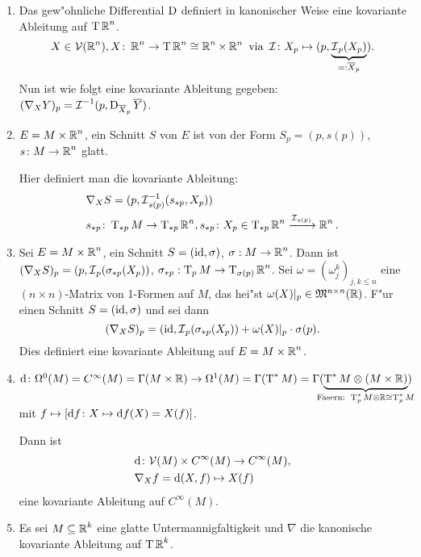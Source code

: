 \begin{bsp}
  \begin{enumerate}[label=(\arabic*),leftmargin=*]
  \item Das gew"ohnliche Differential $\operatorname{D}$ definiert in kanonischer Weise eine kovariante Ableitung auf $\operatorname{T}\operatorname{\mathbb{R}}^n$.
    \begin{align*}
      X \in \mathcal V(\operatorname{\mathbb{R}}^n), X \colon \operatorname{\mathbb{R}}^n \to \operatorname{T}\operatorname{\mathbb{R}}^n \cong \operatorname{\mathbb{R}}^n \times \operatorname{\mathbb{R}}^n \text{ via } \operatorname{\mathcal{I}}\colon X_p \mapsto (p,\underbrace{\operatorname{\mathcal{I}}_p(X_p)}_{=:\overline X_p}).
    \end{align*}
    Nun ist wie folgt eine kovariante Ableitung gegeben: $(\nabla_XY)_p = \operatorname{\mathcal{I}}^{-1}(p,\operatorname{D}_{\overline X_p}\overline Y)$.
  \item $E = M \times \operatorname{\mathbb{R}}^n$, ein Schnitt $S$ von $E$ ist von der Form $S_p = (p,s(p))$, $s \colon M \to \operatorname{\mathbb{R}}^n$ glatt.

    Hier definiert man die kovariante Ableitung:
    \begin{align*}
      & \nabla_XS = (p,\operatorname{\mathcal{I}}_{s(p)}^{-1}(s_{*p},X_p))\\
      &  s_{*p}\colon \operatorname{T}_{*p}M \to \operatorname{T}_{*p}\operatorname{\mathbb{R}}^n, s_{*p}\colon X_p \in \operatorname{T}_{*p}\operatorname{\mathbb{R}}^n \xrightarrow{\operatorname{\mathcal{I}}_{s(p)}} \operatorname{\mathbb{R}}^n.
    \end{align*}
  \item Sei $E = M \times \operatorname{\mathbb{R}}^n$, ein Schnitt $S = (\operatorname{id}, \sigma)$, $\sigma: M \to \operatorname{\mathbb{R}}^n$. Dann ist $(\nabla_X S)_p = (p, \operatorname{\mathcal{I}}_p(\sigma_{*p}(X_p))$, $\sigma_{*p}: \operatorname{T}_pM \to \operatorname{T}_{\sigma(p)}\operatorname{\mathbb{R}}^n$. Sei $ \omega = (\omega_j^k)_{j,k \le n}$ eine $(n\times n)$-Matrix von 1-Formen auf $M$, das hei"st $\omega(X)|_p \in \mathfrak M^{n\times n}(\operatorname{\mathbb{R}})$.
    F"ur einen Schnitt $S = (\operatorname{id}, \sigma)$ und sei dann
    \[ (\nabla_XS)_p = (\operatorname{id}, \operatorname{\mathcal{I}}_p(\sigma_{*p}(X_p)) + \omega(X)|_p \cdot \sigma(p). \]
    Dies definiert eine kovariante Ableitung auf $E = M \times \operatorname{\mathbb{R}}^n$.
  \item $\dop \colon \Omega^0(M) = C^{\infty}(M) = \Gamma(M\times \R) \to \Omega^1(M) = \Gamma(\T^{*}M) = \Gamma(\underbrace{\T^{*}M \otimes (M \times \R)}_{\mathclap{\text{Fasern: } \T_p^{*}M\otimes\R \cong \T_p^{*}M}})$ mit $f \mapsto [\mathrm{d} f \colon X \mapsto \mathrm{d} f(X) = X(f)]$.

    Dann ist
    \begin{align*}
      & \mathrm{d} \colon \mathcal V(M) \times C^{\infty}(M) \to C^{\infty}(M),\\
      & \nabla_Xf = \mathrm{d} (X,f) \mapsto X(f)
    \end{align*}
    eine kovariante Ableitung auf $C^{\infty}(M)$.
  \item
    Es sei $M \subseteq \operatorname{\mathbb{R}}^k$ eine glatte Untermannigfaltigkeit und $\nabla$ die kanonische kovariante Ableitung auf $\operatorname{T} \operatorname{\mathbb{R}}^k$.


\end{enumerate}
\end{bsp}
